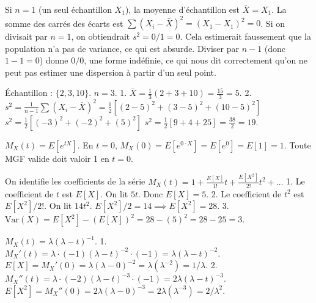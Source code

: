 \begin{correctionbox}
Si $n=1$ (un seul échantillon $X_1$), la moyenne d'échantillon est $\bar{X} = X_1$.
La somme des carrés des écarts est $\sum (X_i - \bar{X})^2 = (X_1 - X_1)^2 = 0$.
Si on divisait par $n=1$, on obtiendrait $s^2 = 0/1 = 0$. Cela estimerait faussement que la population n'a pas de variance, ce qui est absurde.
Diviser par $n-1$ (donc $1-1=0$) donne $0/0$, une forme indéfinie, ce qui nous dit correctement qu'on ne peut pas estimer une dispersion à partir d'un seul point.
\end{correctionbox}

\begin{correctionbox}
Échantillon : $\{ 2, 3, 10 \}$. $n=3$.
1.  $\bar{X} = \frac{1}{3} (2 + 3 + 10) = \frac{15}{3} = 5$.
2.  $s^2 = \frac{1}{n-1} \sum (X_i - \bar{X})^2 = \frac{1}{2} \left[ (2-5)^2 + (3-5)^2 + (10-5)^2 \right]$
    $s^2 = \frac{1}{2} \left[ (-3)^2 + (-2)^2 + (5)^2 \right]$
    $s^2 = \frac{1}{2} [ 9 + 4 + 25 ] = \frac{38}{2} = 19$.
\end{correctionbox}

\begin{correctionbox}
$M_X(t) = E[e^{tX}]$.
En $t=0$, $M_X(0) = E[e^{0 \cdot X}] = E[e^0] = E[1] = 1$.
Toute MGF valide doit valoir 1 en $t=0$.
\end{correctionbox}

\begin{correctionbox}
On identifie les coefficients de la série $M_X(t) = 1 + \frac{E[X]}{1!}t + \frac{E[X^2]}{2!}t^2 + \dots$
1.  Le coefficient de $t$ est $E[X]$. On lit $5t$. Donc $E[X] = 5$.
2.  Le coefficient de $t^2$ est $E[X^2]/2!$. On lit $14t^2$.
    $E[X^2] / 2 = 14 \implies E[X^2] = 28$.
3.  $\text{Var}(X) = E[X^2] - (E[X])^2 = 28 - (5)^2 = 28 - 25 = 3$.
\end{correctionbox}

\begin{correctionbox}
$M_X(t) = \lambda (\lambda - t)^{-1}$.
1.  $M_X'(t) = \lambda \cdot (-1) (\lambda - t)^{-2} \cdot (-1) = \lambda (\lambda - t)^{-2}$.
    $E[X] = M_X'(0) = \lambda (\lambda - 0)^{-2} = \lambda (\lambda^{-2}) = 1/\lambda$.
2.  $M_X''(t) = \lambda \cdot (-2) (\lambda - t)^{-3} \cdot (-1) = 2\lambda (\lambda - t)^{-3}$.
    $E[X^2] = M_X''(0) = 2\lambda (\lambda - 0)^{-3} = 2\lambda (\lambda^{-3}) = 2/\lambda^2$.
\end{correctionbox}

